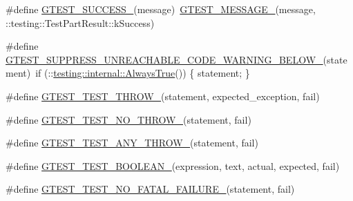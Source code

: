 \begin{DoxyCompactItemize}
\item 
\#define \mbox{\hyperlink{_obj__test_2lib_2googletest-release-1_88_81_2googletest_2include_2gtest_2internal_2gtest-internal_8h_abe012b550eb3807e8c49f7e161bd1567}{G\+T\+E\+S\+T\+\_\+\+S\+U\+C\+C\+E\+S\+S\+\_\+}}(message)~\mbox{\hyperlink{_obj__test_2lib_2googletest-release-1_88_81_2googletest_2include_2gtest_2internal_2gtest-internal_8h_a94c73d5368ec946bc354d0992ad00810}{G\+T\+E\+S\+T\+\_\+\+M\+E\+S\+S\+A\+G\+E\+\_\+}}(message, \+::testing\+::\+Test\+Part\+Result\+::k\+Success)
\item 
\#define \mbox{\hyperlink{_obj__test_2lib_2googletest-release-1_88_81_2googletest_2include_2gtest_2internal_2gtest-internal_8h_a2e66f7dfc5cb87e0fa0289f653173c69}{G\+T\+E\+S\+T\+\_\+\+S\+U\+P\+P\+R\+E\+S\+S\+\_\+\+U\+N\+R\+E\+A\+C\+H\+A\+B\+L\+E\+\_\+\+C\+O\+D\+E\+\_\+\+W\+A\+R\+N\+I\+N\+G\+\_\+\+B\+E\+L\+O\+W\+\_\+}}(statement)~if (\+::\mbox{\hyperlink{namespacetesting_1_1internal_a922c9da63cd4bf94fc473b9ecac76414}{testing\+::internal\+::\+Always\+True}}()) \{ statement; \}
\item 
\#define \mbox{\hyperlink{_obj__test_2lib_2googletest-release-1_88_81_2googletest_2include_2gtest_2internal_2gtest-internal_8h_a3f71db93eaf30b0cfca9612b9ac32106}{G\+T\+E\+S\+T\+\_\+\+T\+E\+S\+T\+\_\+\+T\+H\+R\+O\+W\+\_\+}}(statement,  expected\+\_\+exception,  fail)
\item 
\#define \mbox{\hyperlink{_obj__test_2lib_2googletest-release-1_88_81_2googletest_2include_2gtest_2internal_2gtest-internal_8h_a9a109d026b5a904646437d7570e13581}{G\+T\+E\+S\+T\+\_\+\+T\+E\+S\+T\+\_\+\+N\+O\+\_\+\+T\+H\+R\+O\+W\+\_\+}}(statement,  fail)
\item 
\#define \mbox{\hyperlink{_obj__test_2lib_2googletest-release-1_88_81_2googletest_2include_2gtest_2internal_2gtest-internal_8h_af48bbd26d54d4afc5e4cef39b1c76ba3}{G\+T\+E\+S\+T\+\_\+\+T\+E\+S\+T\+\_\+\+A\+N\+Y\+\_\+\+T\+H\+R\+O\+W\+\_\+}}(statement,  fail)
\item 
\#define \mbox{\hyperlink{_obj__test_2lib_2googletest-release-1_88_81_2googletest_2include_2gtest_2internal_2gtest-internal_8h_ae8912365e1d00a7a2bd248268c64aa1a}{G\+T\+E\+S\+T\+\_\+\+T\+E\+S\+T\+\_\+\+B\+O\+O\+L\+E\+A\+N\+\_\+}}(expression,  text,  actual,  expected,  fail)
\item 
\#define \mbox{\hyperlink{_obj__test_2lib_2googletest-release-1_88_81_2googletest_2include_2gtest_2internal_2gtest-internal_8h_a1b37a3c446836d33040f3266a6236081}{G\+T\+E\+S\+T\+\_\+\+T\+E\+S\+T\+\_\+\+N\+O\+\_\+\+F\+A\+T\+A\+L\+\_\+\+F\+A\+I\+L\+U\+R\+E\+\_\+}}(statement,  fail)

\end{DoxyCompactItemize}
